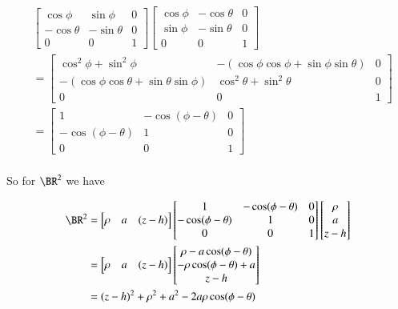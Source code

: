 \begin{align*}
&\begin{bmatrix}
\cos\phi & \sin\phi & 0 \\
-\cos\theta & - \sin\theta & 0 \\
0 & 0 & 1 
\end{bmatrix}
\begin{bmatrix}
\cos\phi & - \cos\theta & 0 \\
\sin\phi & - \sin\theta & 0 \\
0 & 0 & 1 
\end{bmatrix} \\
&=
\begin{bmatrix}
\cos^2\phi + \sin^2\phi & -(\cos\phi \cos\phi + \sin\phi \sin\theta) & 0 \\
-(\cos\phi \cos\theta + \sin\theta \sin\phi) & \cos^2\theta + \sin^2\theta & 0 \\
0 & 0 & 1 
\end{bmatrix} \\
&=
\begin{bmatrix}
1 & - \cos(\phi - \theta) & 0 \\
- \cos(\phi - \theta) & 1  & 0 \\
0 & 0 & 1
\end{bmatrix} \\
\end{align*}

So for $\BR^2$ we have

\begin{align*}
\BR^2
&=
\begin{bmatrix}
\rho & a & (z -h) 
\end{bmatrix}
\begin{bmatrix}
1 & - \cos(\phi - \theta) & 0 \\
- \cos(\phi - \theta) & 1  & 0 \\
0 & 0 & 1
\end{bmatrix} 
\begin{bmatrix}
\rho \\
a \\
z - h
\end{bmatrix} \\
&=
\begin{bmatrix}
\rho & a & (z -h) 
\end{bmatrix}
\begin{bmatrix}
\rho - a \cos(\phi - \theta) \\
-\rho \cos(\phi - \theta) + a \\
z - h
\end{bmatrix} \\
&= 
(z - h)^2 + \rho^2 + a^2 - 2 a \rho \cos(\phi - \theta)
\end{align*}

